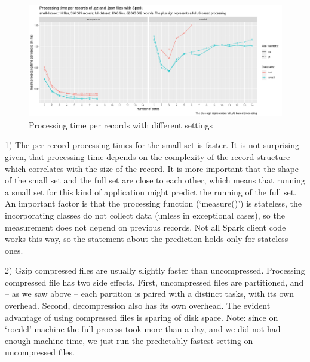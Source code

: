 \begin{figure}
\includegraphics[width=\textwidth]{images/chapter06/small-and-full-measurements-two-servers.png}
\caption{Processing time per records with different settings}
\label{small-and-full-measurements-two-servers}
\end{figure}

1) The per record processing times for the small set is faster. It is not surprising given, that processing time depends on the complexity of the record structure which correlates with the size of the record. It is more important that the shape of the small set and the full set are close to each other, which means that running a small set for this kind of application might predict the running of the full set. An important factor is that the processing function (`measure()') is stateless, the incorporating classes do not collect data (unless in exceptional cases), so the measurement does not depend on previous records. Not all Spark client code works this way, so the statement about the prediction holds only for stateless ones.

2) Gzip compressed files are usually slightly faster than uncompressed. Processing compressed file has two side effects. First, uncompressed files are partitioned, and -- as we saw above -- each partition is paired with a distinct tasks, with its own overhead. Second, decompression also has its own overhead. The evident advantage of using compressed files is sparing of disk space. Note: since on `roedel' machine the full process took more than a day, and we did not had enough machine time, we just run the predictably fastest setting on uncompressed files.

